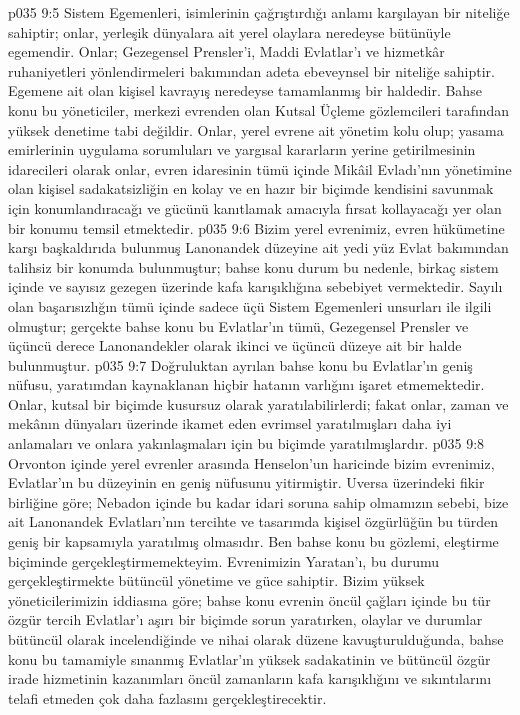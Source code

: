 \vs p035 9:5 Sistem Egemenleri, isimlerinin çağrıştırdığı anlamı karşılayan bir niteliğe sahiptir; onlar, yerleşik dünyalara ait yerel olaylara neredeyse bütünüyle egemendir. Onlar; Gezegensel Prensler’i, Maddi Evlatlar’ı ve hizmetkâr ruhaniyetleri yönlendirmeleri bakımından adeta ebeveynsel bir niteliğe sahiptir. Egemene ait olan kişisel kavrayış neredeyse tamamlanmış bir haldedir. Bahse konu bu yöneticiler, merkezi evrenden olan Kutsal Üçleme gözlemcileri tarafından yüksek denetime tabi değildir. Onlar, yerel evrene ait yönetim kolu olup; yasama emirlerinin uygulama sorumluları ve yargısal kararların yerine getirilmesinin idarecileri olarak onlar, evren idaresinin tümü içinde Mikâil Evladı’nın yönetimine olan kişisel sadakatsizliğin en kolay ve en hazır bir biçimde kendisini savunmak için konumlandıracağı ve gücünü kanıtlamak amacıyla fırsat kollayacağı yer olan bir konumu temsil etmektedir.
\vs p035 9:6 Bizim yerel evrenimiz, evren hükümetine karşı başkaldırıda bulunmuş Lanonandek düzeyine ait yedi yüz Evlat bakımından talihsiz bir konumda bulunmuştur; bahse konu durum bu nedenle, birkaç sistem içinde ve sayısız gezegen üzerinde kafa karışıklığına sebebiyet vermektedir. Sayılı olan başarısızlığın tümü içinde sadece üçü Sistem Egemenleri unsurları ile ilgili olmuştur; gerçekte bahse konu bu Evlatlar’ın tümü, Gezegensel Prensler ve üçüncü derece Lanonandekler olarak ikinci ve üçüncü düzeye ait bir halde bulunmuştur.
\vs p035 9:7 Doğruluktan ayrılan bahse konu bu Evlatlar’ın geniş nüfusu, yaratımdan kaynaklanan hiçbir hatanın varlığını işaret etmemektedir. Onlar, kutsal bir biçimde kusursuz olarak yaratılabilirlerdi; fakat onlar, zaman ve mekânın dünyaları üzerinde ikamet eden evrimsel yaratılmışları daha iyi anlamaları ve onlara yakınlaşmaları için bu biçimde yaratılmışlardır.
\vs p035 9:8 Orvonton içinde yerel evrenler arasında Henselon’un haricinde bizim evrenimiz, Evlatlar’ın bu düzeyinin en geniş nüfusunu yitirmiştir. Uversa üzerindeki fikir birliğine göre; Nebadon içinde bu kadar idari soruna sahip olmamızın sebebi, bize ait Lanonandek Evlatları’nın tercihte ve tasarımda kişisel özgürlüğün bu türden geniş bir kapsamıyla yaratılmış olmasıdır. Ben bahse konu bu gözlemi, eleştirme biçiminde gerçekleştirmemekteyim. Evrenimizin Yaratan’ı, bu durumu gerçekleştirmekte bütüncül yönetime ve güce sahiptir. Bizim yüksek yöneticilerimizin iddiasına göre; bahse konu evrenin öncül çağları içinde bu tür özgür tercih Evlatlar’ı aşırı bir biçimde sorun yaratırken, olaylar ve durumlar bütüncül olarak incelendiğinde ve nihai olarak düzene kavuşturulduğunda, bahse konu bu tamamiyle sınanmış Evlatlar’ın yüksek sadakatinin ve bütüncül özgür irade hizmetinin kazanımları öncül zamanların kafa karışıklığını ve sıkıntılarını telafi etmeden çok daha fazlasını gerçekleştirecektir.
